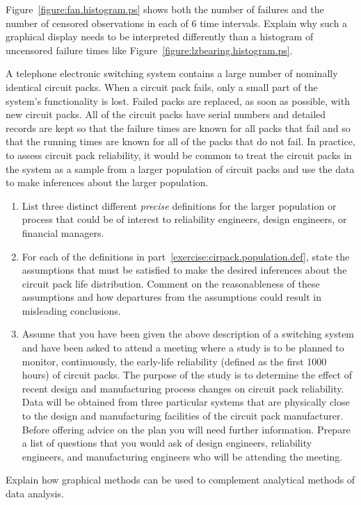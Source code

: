 \begin{exercise}
Figure~\ref{figure:fan.histogram.ps} shows both the number of failures
and the number of censored observations in each of 6 time intervals.
Explain why such a graphical display needs to be interpreted
differently than a histogram of uncensored failure times like
Figure~\ref{figure:lzbearing.histogram.ps}.
\end{exercise}

\begin{exercise}
A telephone electronic switching system contains a large number of
nominally identical circuit packs.  When a circuit pack fails, only a
small part of the system's functionality is lost. Failed packs are
replaced, as soon as possible, with new circuit packs.  All of the
circuit packs have serial numbers and detailed records are kept so
that the failure times are known for all packs that fail and so that
the running times are known for all of the packs that do not fail.  In
practice, to assess circuit pack reliability, it would be
common to treat the circuit packs in the system as a sample from a
larger population of circuit packs and use the data to make inferences
about the larger population.
\begin{enumerate}
\item
\label{exercise:cirpack.population.def}
List three distinct different {\em precise} 
definitions for the larger population or process
that could be of interest to
reliability engineers, design engineers, or financial managers.
\item
For each of the definitions in
part~\ref{exercise:cirpack.population.def}, state the assumptions that
must be satisfied to make the desired inferences about the circuit
pack life distribution. Comment on the reasonableness of these
assumptions and how departures from the assumptions could result in
misleading conclusions.
\item
Assume that you have been given the above description of a switching
system and have been asked to attend a meeting where a study is to be
planned to monitor, continuously, the early-life reliability (defined
as the first 1000 hours) of circuit packs.  The purpose of the study
is to determine the effect of recent design and manufacturing process
changes on circuit pack reliability.  Data will be obtained from three
particular systems that are physically close to the design and
manufacturing facilities of the circuit pack manufacturer. Before
offering advice on the plan you will need further information. Prepare
a list of questions that you would ask of design engineers,
reliability engineers, and manufacturing engineers who will be
attending the meeting.
\end{enumerate}
\end{exercise}
\begin{exercise}
Explain how graphical methods can be used to complement analytical
methods of data analysis.
\end{exercise}

